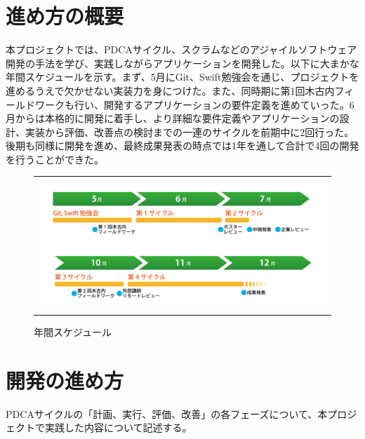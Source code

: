 \section{進め方の概要}
本プロジェクトでは、PDCAサイクル、スクラムなどのアジャイルソフトウェア開発の手法を学び、実践しながらアプリケーションを開発した。以下に大まかな年間スケジュールを示す。まず、5月にGit、Swift勉強会を通じ、プロジェクトを進めるうえで欠かせない実装力を身につけた。また、同時期に第1回木古内フィールドワークも行い、開発するアプリケーションの要件定義を進めていった。6月からは本格的に開発に着手し、より詳細な要件定義やアプリケーションの設計、実装から評価、改善点の検討までの一連のサイクルを前期中に2回行った。後期も同様に開発を進め、最終成果発表の時点では1年を通して合計で4回の開発を行うことができた。
\begin{figure}[htbp]
  \begin{flushleft}
    \begin{tabular}{c}

      \begin{minipage}{0.7\hsize}
        \begin{center}
\includegraphics[width=15cm, bb=0 0 1478 674]{procedure-1.png}
       
        \end{center}
      \end{minipage}

    \end{tabular}
    \caption{年間スケジュール}
    \label{fig:lena}
  \end{flushleft}
\end{figure}



\section{開発の進め方}
PDCAサイクルの「計画、実行、評価、改善」の各フェーズについて、本プロジェクトで実践した内容について記述する。
